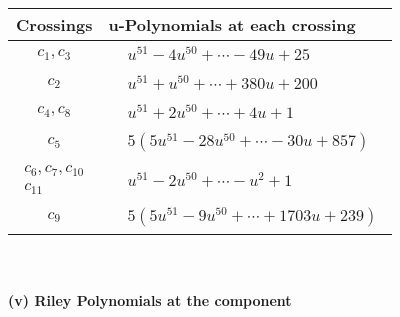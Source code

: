 \documentclass[1p]{elsarticle_modified}
\theoremstyle{definition}
\begin{document}
\begin{tabular}{m{50pt}|m{274pt}}
Crossings & \hspace{64pt}u-Polynomials at each crossing \\
\hline $$\begin{aligned}c_{1},c_{3}\end{aligned}$$&$\begin{aligned}
&u^{51}-4 u^{50}+\cdots-49 u+25
\end{aligned}$\\
\hline $$\begin{aligned}c_{2}\end{aligned}$$&$\begin{aligned}
&u^{51}+u^{50}+\cdots+380 u+200
\end{aligned}$\\
\hline $$\begin{aligned}c_{4},c_{8}\end{aligned}$$&$\begin{aligned}
&u^{51}+2 u^{50}+\cdots+4 u+1
\end{aligned}$\\
\hline $$\begin{aligned}c_{5}\end{aligned}$$&$\begin{aligned}
&5(5 u^{51}-28 u^{50}+\cdots-30 u+857)
\end{aligned}$\\
\hline $$\begin{aligned}c_{6},c_{7},c_{10}\\c_{11}\end{aligned}$$&$\begin{aligned}
&u^{51}-2 u^{50}+\cdots- u^2+1
\end{aligned}$\\
\hline $$\begin{aligned}c_{9}\end{aligned}$$&$\begin{aligned}
&5(5 u^{51}-9 u^{50}+\cdots+1703 u+239)
\end{aligned}$\\
\hline
\end{tabular}\\~\\
\newpage\renewcommand{\arraystretch}{1}
\flushleft \textbf{(v) Riley Polynomials at the component}\newline \\
\end{document}
